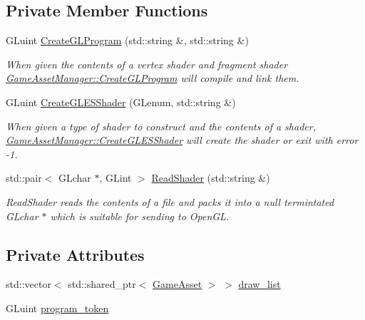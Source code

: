 \subsection*{Private Member Functions}
\begin{DoxyCompactItemize}
\item 
G\+Luint \hyperlink{classGameAssetManager_abec45b44a8b35ad2d7d817ba10e0dd8d}{Create\+G\+L\+Program} (std\+::string \&, std\+::string \&)
\begin{DoxyCompactList}\small\item\em When given the contents of a vertex shader and fragment shader \hyperlink{classGameAssetManager_abec45b44a8b35ad2d7d817ba10e0dd8d}{Game\+Asset\+Manager\+::\+Create\+G\+L\+Program} will compile and link them. \end{DoxyCompactList}\item 
G\+Luint \hyperlink{classGameAssetManager_a1a1e5c07f941e8d3fda40d9442ac7037}{Create\+G\+L\+E\+S\+Shader} (G\+Lenum, std\+::string \&)
\begin{DoxyCompactList}\small\item\em When given a type of shader to construct and the contents of a shader, \hyperlink{classGameAssetManager_a1a1e5c07f941e8d3fda40d9442ac7037}{Game\+Asset\+Manager\+::\+Create\+G\+L\+E\+S\+Shader} will create the shader or exit with error -\/1. \end{DoxyCompactList}\item 
std\+::pair$<$ G\+Lchar $\ast$, G\+Lint $>$ \hyperlink{classGameAssetManager_a23b124a213308a68a882727127601c97}{Read\+Shader} (std\+::string \&)
\begin{DoxyCompactList}\small\item\em Read\+Shader reads the contents of a file and packs it into a null termintated G\+Lchar $\ast$ which is suitable for sending to Open\+G\+L. \end{DoxyCompactList}\end{DoxyCompactItemize}
\subsection*{Private Attributes}
\begin{DoxyCompactItemize}
\item 
std\+::vector$<$ std\+::shared\+\_\+ptr$<$ \hyperlink{classGameAsset}{Game\+Asset} $>$ $>$ \hyperlink{classGameAssetManager_a671cddd92f1de4186c582fe0c4297b7d}{draw\+\_\+list}
\item 
G\+Luint \hyperlink{classGameAssetManager_ad7bab17862e06ca692289f934b40548b}{program\+\_\+token}
\end{DoxyCompactItemize}


